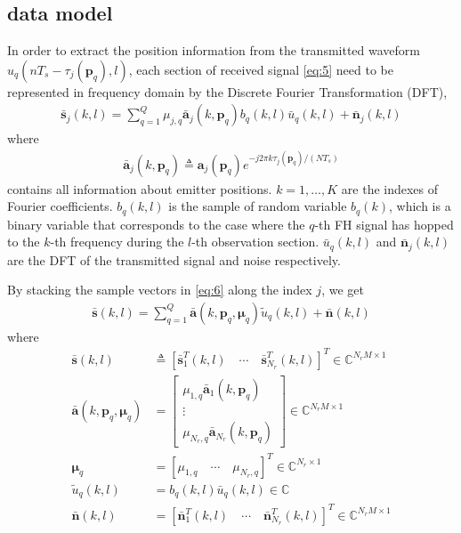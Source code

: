 \documentclass[journal,10pt]{IEEEtran}
\begin{document}
\subsection{data model}
In order to extract the position information from the transmitted waveform $u_q(nT_s-\tau_j(\boldsymbol{p}_q),l)$, 
each section of received signal \eqref{eq:5} need to be represented in frequency domain by the Discrete Fourier Transformation (DFT), 
\begin{align}\label{eq:8}
    \bar{\boldsymbol{s}}_j(k,l)=\sum_{q=1}^Q  \mu_{j,q}\bar{\boldsymbol{a}}_j(k,\boldsymbol{p}_q) b_q(k,l)\bar{u}_q(k,l)+\bar{\boldsymbol{n}}_j(k,l)
\end{align}
where 
\begin{align}\label{eq:9}
    \bar{\boldsymbol{a}}_j(k,\boldsymbol{p}_q)\triangleq \boldsymbol{a}_j(\boldsymbol{p}_q)e^{-j2\pi k\tau_j(\boldsymbol{p}_q)/(NT_s)}
\end{align}
contains all information about emitter positions.
$k=1,\dots,K$ are the indexes of Fourier coefficients. $b_q(k,l)$ is the sample of random variable $b_q(k)$, which is a binary variable that corresponds to the case 
where the $q$-th FH signal has hopped to the $k$-th frequency during the $l$-th observation section. 
$\bar{u}_q(k,l)$ and $\bar{\boldsymbol{n}}_j(k,l)$ are the DFT of the transmitted signal and noise respectively.

By stacking the sample vectors in \eqref{eq:6} along the index $j$, we get
\begin{align}\label{eq:10}
    \bar{\boldsymbol{s}}(k,l)=\sum_{q=1}^Q \bar{\boldsymbol{a}}(k,\boldsymbol{p}_q,\boldsymbol{\mu}_{q}) \tilde{u}_q(k,l) +\bar{\boldsymbol{n}}(k,l)
\end{align}
where 
\begin{align}\label{eq:d1}
    \bar{\boldsymbol{s}}(k,l)&\triangleq[\bar{\boldsymbol{s}}_1^T(k,l)\quad  \cdots \quad \bar{\boldsymbol{s}}_{N_r}^T(k,l)]^T \in \mathbb{C}^{N_rM\times 1 }\\
    \bar{\boldsymbol{a}}(k,\boldsymbol{p}_q,\boldsymbol{\mu}_{q})&=\left[
     \begin{array}{c}
        \mu_{1,q}\bar{\boldsymbol{a}}_1(k,\boldsymbol{p}_q)\\
        \vdots\\
        \mu_{N_r,q}\bar{\boldsymbol{a}}_{N_r}(k,\boldsymbol{p}_q)
     \end{array}
        \right]\in \mathbb{C}^{N_rM\times 1}\\
    \boldsymbol{\mu}_{q}&=[\mu_{1,q} \quad \cdots \quad \mu_{N_r,q}]^T \in \mathbb{C}^{N_r\times 1} \\ 
    \tilde{u}_q(k,l)&=b_q(k,l)\bar{u}_q(k,l)\in \mathbb{C}\\
    \bar{\boldsymbol{n}}(k,l)&=[\bar{\boldsymbol{n}}_1^T(k,l)\quad \cdots \quad \bar{\boldsymbol{n}}_{N_r}^T(k,l)]^T \in \mathbb{C}^{N_rM\times 1}
\end{align}
\end{document}
